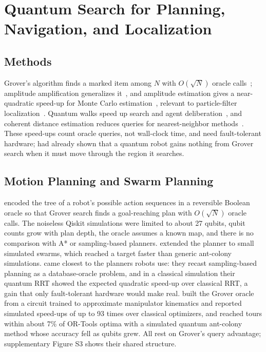 \documentclass[acmsmall,screen,review]{acmart}
\begin{document}
\section{Quantum Search for Planning, Navigation, and Localization}\label{sec:search}

\subsection{Methods}\label{sec:search-methods}
Grover's algorithm finds a marked item among $N$ with $O(\sqrt{N})$ oracle calls~\cite{Grover1996}; amplitude amplification generalizes it~\cite{Brassard2002}, and amplitude estimation gives a near-quadratic speed-up for Monte Carlo estimation~\cite{Montanaro2015}, relevant to particle-filter localization~\cite{Dellaert1999}. Quantum walks speed up search and agent deliberation~\cite{Paparo2014}, and coherent distance estimation reduces queries for nearest-neighbor methods~\cite{Wiebe2015}. These speed-ups count oracle queries, not wall-clock time, and need fault-tolerant hardware; \citet{Benioff2002} had already shown that a quantum robot gains nothing from Grover search when it must move through the region it searches.

\subsection{Motion Planning and Swarm Planning}\label{sec:search-planning}
\citet{Chella2022} encoded the tree of a robot's possible action sequences in a reversible Boolean oracle so that Grover search finds a goal-reaching plan with $O(\sqrt{N})$ oracle calls. The noiseless Qiskit simulations were limited to about 27 qubits, qubit counts grow with plan depth, the oracle assumes a known map, and there is no comparison with A* or sampling-based planners. \citet{Chella2023} extended the planner to small simulated swarms, which reached a target faster than generic ant-colony simulations. \citet{Lathrop2023} came closest to the planners robots use: they recast sampling-based planning as a database-oracle problem, and in a classical simulation their quantum RRT showed the expected quadratic speed-up over classical RRT, a gain that only fault-tolerant hardware would make real. \citet{Nigatu2025} built the Grover oracle from a circuit trained to approximate manipulator kinematics and reported simulated speed-ups of up to 93 times over classical optimizers, and \citet{Sarkar2024} reached tours within about 7\% of OR-Tools optima with a simulated quantum ant-colony method whose accuracy fell as qubits grew. All rest on Grover's query advantage; supplementary Figure S3 shows their shared structure.
\end{document}
